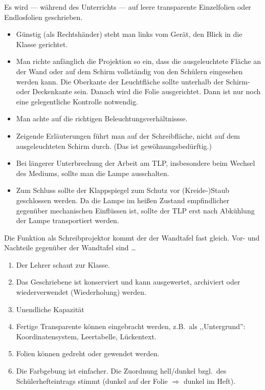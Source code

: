 Es wird --- w\"{a}hrend des Unterrichts --- auf leere
transparente Einzelfolien oder Endlosfolien geschrieben.
\begin{itemize}
\item
G\"{u}nstig (als Rechtsh\"{a}nder) steht man links vom Ger\"{a}t, den
Blick in die Klasse gerichtet.
\item
Man richte anf\"{a}nglich die Projektion so ein, dass die ausgeleuchtete
Fl\"{a}che an der Wand oder auf dem Schirm vollst\"{a}ndig von den Sch\"{u}lern
eingesehen werden kann.
Die Oberkante der Leuchtfl\"{a}che sollte unterhalb der Schirm- oder
Deckenkante sein. Danach wird die Folie ausgerichtet.
Dann ist nur noch eine gelegentliche Kontrolle notwendig.
\item
Man achte auf die richtigen Beleuchtungsverh\"{a}ltnissse.
\item
Zeigende Erl\"{a}uterungen f\"{u}hrt man auf der Schreibfl\"{a}che, nicht auf
dem ausgeleuchteten Schirm durch. (Das ist gew\"{o}hnungsbed\"{u}rftig.)
\item
Bei l\"{a}ngerer Unterbrechung der Arbeit am TLP, insbesondere
beim Wechsel des Mediums, sollte man die Lampe ausschalten.
\item
Zum Schluss sollte der Klappspiegel zum Schutz vor (Kreide-)Staub geschlossen werden.
Da die Lampe im hei{\ss}en Zustand empfindlicher gegen\"{u}ber mechanischen Einfl\"{u}ssen ist, sollte
der TLP erst nach Abk\"{u}hlung der Lampe transportiert werden.
\end{itemize}

Die Funktion als Schreibprojektor kommt der der
Wandtafel fast gleich.
Vor- und Nachteile gegen\"{u}ber der Wandtafel sind \dots
\begin{enumerate}
\item Der Lehrer schaut zur Klasse.
\item Das Geschriebene ist konserviert und kann
ausgewertet, archiviert oder wiederverwendet (Wiederholung) werden.
\item Unendliche Kapazit\"{a}t
\item Fertige Transparente k\"{o}nnen eingebracht werden, z.B.\ als
,,Untergrund'':
Koordinatensystem, Leertabelle, L\"{u}ckentext.
\item
Folien k\"{o}nnen gedreht oder gewendet werden.
\item
Die Farbgebung ist einfacher.
Die Zuordnung hell/dunkel bzgl.\ des Sch\"{u}lerhefteintrags stimmt
(dunkel auf der Folie $\Rightarrow$ dunkel im Heft).
\end{enumerate}

